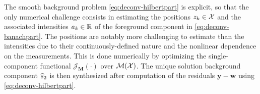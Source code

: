 \documentclass[12pt]{article}
\begin{document}
    
        
        The smooth background problem \eqref{eq:deconv-hilbertpart} is explicit, so that the only numerical challenge consists in estimating the positions $z_k \in \mathcal{X}$ and the associated intensities $a_k \in \mathbb{R}$ of the foreground component in \eqref{eq:deconv-banachpart}. The positions are notably more challenging to estimate than the intensities due to their continuously-defined nature and the nonlinear dependence on the measurements. This is done numerically by optimizing the single-component functional $\mathcal{J}_{\mathbf{M}}(\cdot)$ over ${\mathcal{M}}({\mathcal{X}})$.
        The unique solution background component $\widehat{s}_2$ is then synthesized after computation of the residuals $\bm{y}-\bm{w}$ using \eqref{eq:deconv-hilbertpart}.
\end{document}
